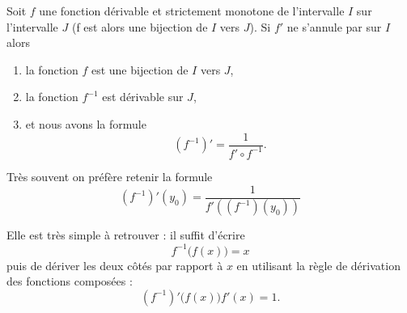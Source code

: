 \begin{proposition}      \label{PROPooSGTBooFxUuXK}
	Soit \(f \) une fonction dérivable et strictement monotone de l'intervalle \( I\) sur l'intervalle \( J\)  (f est alors une bijection de \( I\) vers \( J\)). Si \( f'\)  ne s'annule par sur \( I\) alors
	\begin{enumerate}
		\item
		      la fonction \( f\) est une bijection de \( I\) vers \( J\),
		\item
		      la fonction \( f^{-1}\) est dérivable sur \( J\),
		\item
		      et nous avons la formule
		      \begin{equation}        \label{EQooELIHooDxUFxH}
			      (f^{-1})'=\frac{1}{ f'\circ f^{-1} }.
		      \end{equation}
	\end{enumerate}
\end{proposition}

\begin{normaltext}
	Très souvent on préfère retenir la formule
	\begin{equation}\label{EqWWAooBRFNsv}
		(f^{-1})'(y_0) = \frac{1}{f'\left((f^{-1})(y_0)\right)}
	\end{equation}

	Elle est très simple à retrouver : il suffit d'écrire
	\begin{equation}
		f^{-1}\big( f(x) \big)=x
	\end{equation}
	puis de dériver les deux côtés par rapport à \( x\) en utilisant la règle de dérivation des fonctions composées :
	\begin{equation}
		(f^{-1})'\big( f(x) \big)f'(x)=1.
	\end{equation}
\end{normaltext}


